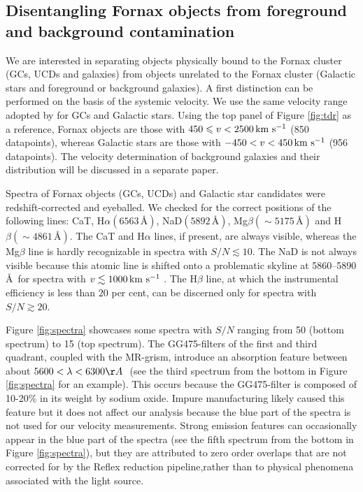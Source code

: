 \documentclass[useAMS,usenatbib]{mn2e}
\newcommand{\kms}{\mbox{\,km~s$^{-1}$}}
\begin{document}
\subsection{Disentangling Fornax objects from foreground and background 
contamination}

We are interested in separating objects physically bound to the Fornax cluster 
(GCs, UCDs and galaxies) from objects unrelated to the Fornax cluster (Galactic 
stars and foreground or background galaxies). A first distinction can be 
performed on the basis of the systemic velocity. We use the same velocity range 
adopted by \cite{Schuberth} for GCs and Galactic stars.
Using the top panel of Figure \ref{fig:tdr} as a reference, Fornax objects are 
those with $450 \le v <2500 \kms$ (850 datapoints), whereas Galactic stars are 
those with $-450<v<450 \kms$ (956 datapoints). The velocity determination of 
background galaxies and their distribution will be discussed in a separate 
paper.

Spectra of Fornax objects (GCs, UCDs) and Galactic star candidates were 
redshift-corrected and eyeballed. We checked for the correct positions of the 
following lines: CaT, H$\alpha (6563 \, \mbox{\AA})$, NaD$(5892 \, 
\mbox{\AA})$, Mg$\beta (\sim 5175 \, \mbox{\AA})$ and H$\beta (\sim 4861\, 
\mbox{\AA})$. The CaT and H$\alpha$ lines, if present, are always visible, 
whereas the Mg$\beta$ line is hardly recognizable in spectra with $S/N \lesssim 
10$. The NaD is not always visible because this atomic line is shifted onto a 
problematic skyline at 5860--5890 \AA\ for spectra with $v \lesssim 1000\kms$ . 
The H$\beta$ line, at which the instrumental efficiency is less than $20$ per 
cent, can be discerned only for spectra with $S/N \gtrsim 20 $.

Figure \ref{fig:spectra} showcases some spectra with $S/N$ ranging from 50 
(bottom spectrum) to 15 (top spectrum). 
The GG475-filters of the first and third quadrant, coupled with the MR-grism, 
introduce an absorption feature between about $5600 < \lambda < 6300 \AA\ $ 
(see the third spectrum from the bottom in Figure \ref{fig:spectra} for an 
example). This occurs because the GG475-filter is composed of 10-20\% in its 
weight by sodium oxide. Impure manufacturing likely caused this feature but it 
does not affect our analysis because the blue part of the spectra is not used 
for our velocity measurements. Strong emission features can occasionally appear 
in the blue part of the spectra (see the fifth spectrum from the bottom in 
Figure \ref{fig:spectra}), but they are attributed to zero order overlaps that 
are not corrected for by the Reflex reduction pipeline,rather than to physical 
phenomena associated with the light source. 
\end{document}
